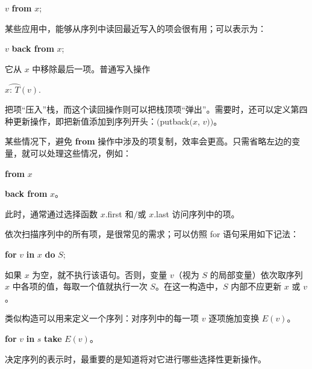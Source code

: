 \quad $v$ \textbf{from} $x$;

\noindent
某些应用中，能够从序列中读回最近写入的项会很有用；可以表示为：

\quad $v$ \textbf{back from} $x$;

\noindent
它从 $x$ 中移除最后一项。普通写入操作

\quad $x\wideparen{\text{: } T}(v).$

\noindent
把项“压入”栈，而这个读回操作则可以把栈顶项“弹出”。需要时，还可以定义第四种更新操作，即把新值添加到序列开头：$($putback$(x$, $v))$。

某些情况下，避免 \textbf{from} 操作中涉及的项复制，效率会更高。只需省略左边的变量，就可以处理这些情况，例如：

\quad \textbf{from} $x$

\quad \textbf{back from} $x$。

\noindent
此时，通常通过选择函数 $x$.first 和$/$或 $x$.last 访问序列中的项。

依次扫描序列中的所有项，是很常见的需求；可以仿照 for 语句采用如下记法：

\quad \textbf{for} $v$ \textbf{in} $x$ \textbf{do} $S$;

\noindent
如果 $x$ 为空，就不执行该语句。否则，变量 $v$（视为 $S$ 的局部变量）依次取序列 $x$ 中各项的值，每取一个值就执行一次 $S$。在这一构造中，$S$ 内部不应更新 $x$ 或 $v$。

类似构造可以用来定义一个序列：对序列中的每一项 $v$ 逐项施加变换 $E(v)$。

\quad \textbf{for} $v$ \textbf{in} $s$ \textbf{take} $E(v)$。

决定序列的表示时，最重要的是知道将对它进行哪些选择性更新操作。

